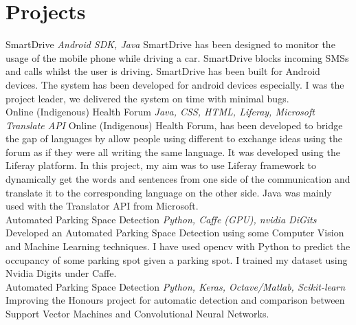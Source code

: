\documentclass[letterpaper]{moderncv}        %
\begin{document}
\section{Projects}
\cventry
{}
{SmartDrive}
{}
{\textit{Android SDK, Java}}
{}
{SmartDrive has been designed to monitor the usage of the mobile phone while driving a car. SmartDrive blocks incoming SMSs and calls whilst the user is driving. SmartDrive has been built for Android devices. The system has been developed for android devices especially. I was the project leader, we delivered the system on time with minimal bugs.\\}
	\vspace{1mm}
	\cventry
	{}
	{Online (Indigenous) Health Forum}
	{}
	{\textit{Java, CSS, HTML, Liferay, Microsoft Translate API}}
	{}
	{Online (Indigenous) Health Forum, has been developed to bridge the gap of languages by allow people using different to exchange ideas using the forum as if they were all writing the same language. It was developed using the Liferay platform. In this project, my aim was to use Liferay framework to dynamically get the words and sentences from one side of the communication and translate it to the corresponding language on the other side. Java was mainly used with the Translator API from Microsoft.\\}
		\vspace{1mm}
		\cventry
		{}
		{Automated Parking Space Detection}
		{}
		{\textit{Python, Caffe (GPU), nvidia DiGits}}
		{}
		{Developed an Automated Parking Space Detection using some Computer Vision and Machine Learning techniques. I have used opencv with Python to predict the occupancy of some parking spot given a parking spot. I trained my dataset using Nvidia Digits under Caffe.\\}
			\vspace{1mm}
			\cventry
			{}
			{Automated Parking Space Detection}
			{}
			{\textit{Python, Keras, Octave/Matlab, Scikit-learn}}
			{}
			{Improving the Honours project for automatic detection and comparison between Support Vector Machines and Convolutional Neural Networks.\\}
				\vspace{1mm}
\end{document}
